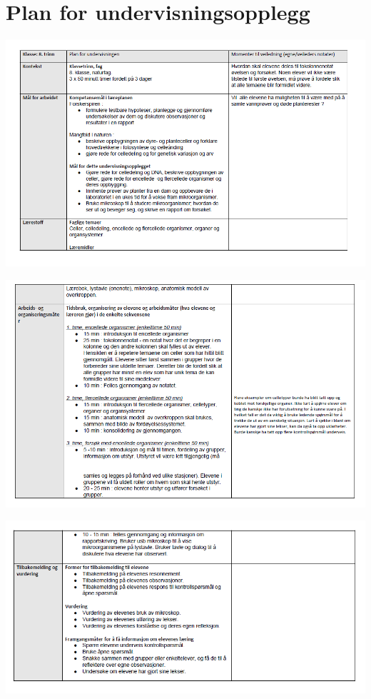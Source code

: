 \documentclass[main.tex]{subfiles}
\begin{document}
\section{Plan for undervisningsopplegg}
\label{sec:plan}
\includegraphics[scale = 0.80,angle=90]{../figures/plan_side1.png}

\includegraphics[scale = 0.80,angle=90]{../figures/plan_side2.png}

\includegraphics[scale = 0.80,angle=90]{../figures/plan_side3.png}
\end{document}
